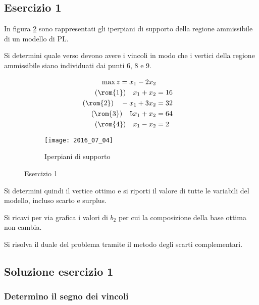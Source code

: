 \documentclass[\main/main.tex]{subfiles}
\begin{document}
\subsection{Esercizio 1}
In figura \ref{2016_iperpiani_supporto} sono rappresentati gli iperpiani di supporto della regione ammissibile di un modello di PL.

Si determini quale verso devono avere i vincoli in modo che i vertici della regione ammissibile siano individuati dai punti 6, 8 e 9.

\begin{figure}
  \begin{subfigure}{0.49\textwidth}
    \begin{align*}
      \max z = x_1 -2x_2                \\
      (\rom{1})\quad x_1 + x_2   & = 16 \\
      (\rom{2})\quad -x_1 + 3x_2 & = 32 \\
      (\rom{3})\quad 5x_1 + x_2  & = 64 \\
      (\rom{4})\quad x_1 - x_2   & = 2
    \end{align*}
  \end{subfigure}
  \begin{subfigure}{0.49\textwidth}
    \texttt{[image: 2016\_07\_04]}
    \caption{Iperpiani di supporto}
    \label{2016_iperpiani_supporto}
  \end{subfigure}
  \caption{Esercizio 1}
\end{figure}

Si determini quindi il vertice ottimo e si riporti il valore di tutte le variabili del modello, incluso scarto e surplus.

Si ricavi per via grafica i valori di $b_2$ per cui la composizione della base ottima non cambia.

Si risolva il duale del problema tramite il metodo degli scarti complementari.

\subsection{Soluzione esercizio 1}
\subsubsection*{Determino il segno dei vincoli}
\end{document}
